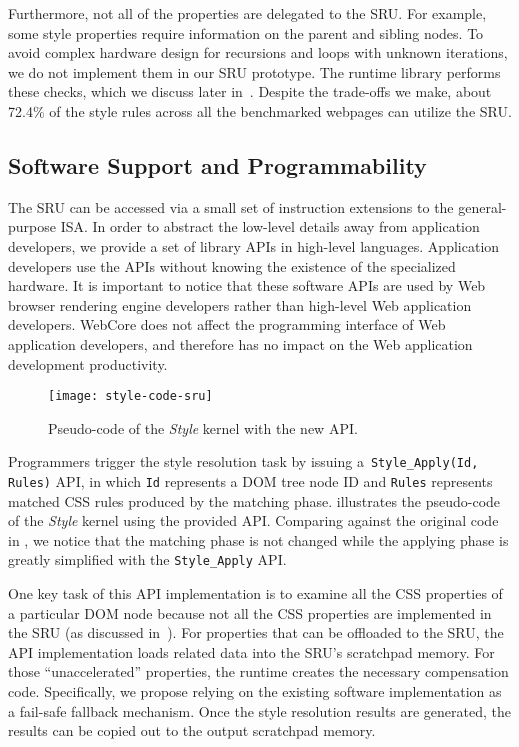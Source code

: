 Furthermore, not all of the properties are delegated to the SRU. For example, some style properties require information on the parent and sibling nodes. To avoid complex hardware design for recursions and loops with unknown iterations, we do not implement them in our SRU prototype. The runtime library performs these checks, which we discuss later in~. Despite the trade-offs we make, about 72.4\% of the style rules across all the benchmarked webpages can utilize the SRU.  

\subsection{Software Support and Programmability}
\label{sec:sru:sw}

The SRU can be accessed via a small set of instruction extensions to the general-purpose ISA. In order to abstract the low-level details away from application developers, we provide a set of library APIs in high-level languages. Application developers use the APIs without knowing the existence of the specialized hardware. It is important to notice that these software APIs are used by Web browser rendering engine developers rather than high-level Web application developers. WebCore does not affect the programming interface of Web application developers, and therefore has no impact on the Web application development productivity.

\begin{figure}[h]
\centering
\captionsetup{width=.8\columnwidth}
\texttt{[image: style-code-sru]}
\caption{\small{Pseudo-code of the \textit{Style} kernel with the new API.}}
\label{fig:style-code-sru}
\end{figure}

Programmers trigger the style resolution task by issuing a~\texttt{Style\_Apply(Id, Rules)} API, in which \texttt{Id} represents a DOM tree node ID and \texttt{Rules} represents matched CSS rules produced by the matching phase.  illustrates the pseudo-code of the \textit{Style} kernel using the provided API. Comparing against the original code in , we notice that the matching phase is not changed while the applying phase is greatly simplified with the \texttt{Style\_Apply} API.

One key task of this API implementation is to examine all the CSS properties of a particular DOM node because not all the CSS properties are implemented in the SRU (as discussed in~). For properties that can be offloaded to the SRU, the API implementation loads related data into the SRU's scratchpad memory. For those ``unaccelerated'' properties, the runtime creates the necessary compensation code. Specifically, we propose relying on the existing software implementation as a fail-safe fallback mechanism. Once the style resolution results are generated, the results can be copied out to the output scratchpad memory.

